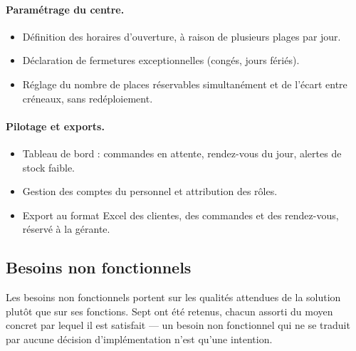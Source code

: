 \paragraph{Paramétrage du centre.}
\begin{itemize}[leftmargin=1.2cm,nosep]
  \item Définition des horaires d'ouverture, à raison de plusieurs plages par
  jour.
  \item Déclaration de fermetures exceptionnelles (congés, jours fériés).
  \item Réglage du nombre de places réservables simultanément et de l'écart
  entre créneaux, sans redéploiement.
\end{itemize}

\paragraph{Pilotage et exports.}
\begin{itemize}[leftmargin=1.2cm,nosep]
  \item Tableau de bord : commandes en attente, rendez-vous du jour, alertes de
  stock faible.
  \item Gestion des comptes du personnel et attribution des rôles.
  \item Export au format Excel des clientes, des commandes et des rendez-vous,
  réservé à la gérante.
\end{itemize}

\subsection{Besoins non fonctionnels}

Les besoins non fonctionnels portent sur les qualités attendues de la solution
plutôt que sur ses fonctions. Sept ont été retenus, chacun assorti du moyen
concret par lequel il est satisfait --- un besoin non fonctionnel qui ne se
traduit par aucune décision d'implémentation n'est qu'une intention.

